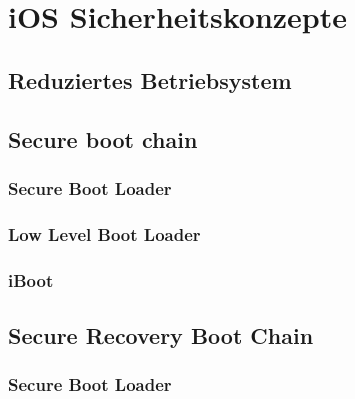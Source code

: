 %
%
% 
% 
% 
\chapter{iOS Sicherheitskonzepte}
\label{ch:iOSSicherheitsKonzepte}
\section{Reduziertes Betriebsystem}
\label{sec:reduziertesOS}

\section{Secure boot chain}
\label{sec:SecBootChain}

\subsection{Secure Boot Loader}
\label{sec:SecBootLoader}

\subsection{Low Level Boot Loader}
\label{sec:LowLevelBootLoader}

\subsection{iBoot}
\label{sec:iBoot}

\section{Secure Recovery Boot Chain}
\label{sec:SecureRecoveryBootChain}
\subsection{Secure Boot Loader}
\label{sec:SecureBootLoader1}
